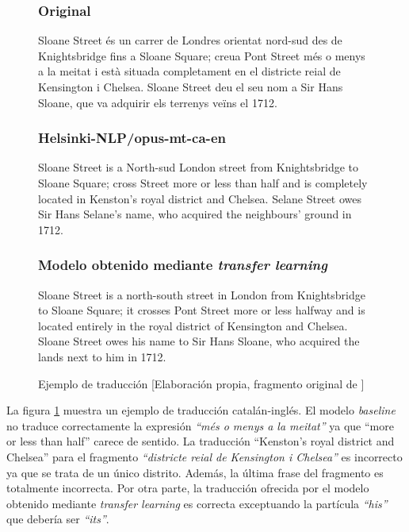 \begin{figure}[H]
\subsubsection{Original}
\begin{spverbatim}
Sloane Street és un carrer de Londres orientat nord-sud des de Knightsbridge fins a Sloane Square; creua Pont Street més o menys a la meitat i està situada completament en el districte reial de Kensington i Chelsea. Sloane Street deu el seu nom a Sir Hans Sloane, que va adquirir els terrenys veïns el 1712.
\end{spverbatim}

\subsubsection{Helsinki-NLP/opus-mt-ca-en}
\begin{spverbatim}
Sloane Street is a North-sud London street from Knightsbridge to Sloane Square; cross Street more or less than half and is completely located in Kenston's royal district and Chelsea. Selane Street owes Sir Hans Selane's name, who acquired the neighbours' ground in 1712.
\end{spverbatim}

\subsubsection{Modelo obtenido mediante \textit{transfer learning}}
\begin{spverbatim}
Sloane Street is a north-south street in London from Knightsbridge to Sloane Square; it crosses Pont Street more or less halfway and is located entirely in the royal district of Kensington and Chelsea. Sloane Street owes his name to Sir Hans Sloane, who acquired the lands next to him in 1712.
\end{spverbatim}
\caption{Ejemplo de traducción [Elaboración propia, fragmento original de \cite{ContributorstoWikimediaprojects2021Aug}]}\label{transferexample}
\end{figure}

La figura \ref{transferexample} muestra un ejemplo de traducción catalán-inglés. El modelo \textit{baseline} no traduce correctamente la expresión \textit{``més o menys a la meitat''} ya que ``more or less than half'' carece de sentido. La traducción ``Kenston's royal district and Chelsea'' para el fragmento \textit{``districte reial de Kensington i Chelsea''} es incorrecto ya que se trata de un único distrito. Además, la última frase del fragmento es totalmente incorrecta. Por otra parte, la traducción ofrecida por el modelo obtenido mediante \textit{transfer learning} es correcta exceptuando la partícula \textit{``his''} que debería ser \textit{``its''}.
